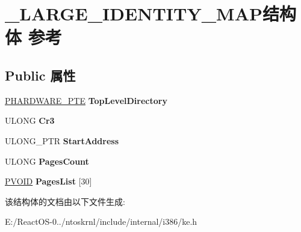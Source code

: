 \hypertarget{struct___l_a_r_g_e___i_d_e_n_t_i_t_y___m_a_p}{}\section{\+\_\+\+L\+A\+R\+G\+E\+\_\+\+I\+D\+E\+N\+T\+I\+T\+Y\+\_\+\+M\+A\+P结构体 参考}
\label{struct___l_a_r_g_e___i_d_e_n_t_i_t_y___m_a_p}
\subsection*{Public 属性}
\begin{DoxyCompactItemize}
\item 
\mbox{\label{struct___l_a_r_g_e___i_d_e_n_t_i_t_y___m_a_p_aae37aa53b46d65a0dcc2ea0e057705a4}} 
\hyperlink{struct___h_a_r_d_w_a_r_e___p_t_e}{P\+H\+A\+R\+D\+W\+A\+R\+E\+\_\+\+P\+TE} {\bfseries Top\+Level\+Directory}
\item 
\mbox{\label{struct___l_a_r_g_e___i_d_e_n_t_i_t_y___m_a_p_ade789089e3db5541ddce66dd19ceb142}} 
U\+L\+O\+NG {\bfseries Cr3}
\item 
\mbox{\label{struct___l_a_r_g_e___i_d_e_n_t_i_t_y___m_a_p_a5197ba990896ad64c98eba4777a74cc7}} 
U\+L\+O\+N\+G\+\_\+\+P\+TR {\bfseries Start\+Address}
\item 
\mbox{\label{struct___l_a_r_g_e___i_d_e_n_t_i_t_y___m_a_p_ae23d02b65bea91fb5bfb2ef9782188b3}} 
U\+L\+O\+NG {\bfseries Pages\+Count}
\item 
\mbox{\label{struct___l_a_r_g_e___i_d_e_n_t_i_t_y___m_a_p_aa0a2a49ff5dca3fa2561804468b37fed}} 
\hyperlink{interfacevoid}{P\+V\+O\+ID} {\bfseries Pages\+List} \mbox{[}30\mbox{]}
\end{DoxyCompactItemize}


该结构体的文档由以下文件生成\+:\begin{DoxyCompactItemize}
\item 
E\+:/\+React\+O\+S-\/0../ntoskrnl/include/internal/i386/ke.\+h\end{DoxyCompactItemize}
